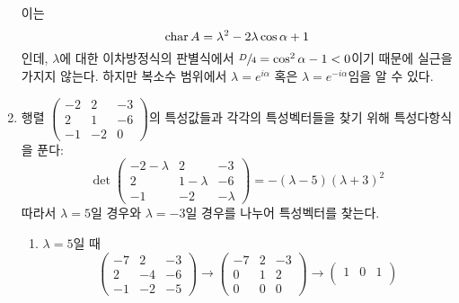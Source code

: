\documentclass[../engineering_mathematics_lecture_note.tex]{subfiles}
\begin{document}
\begin{example}
\begin{enumerate}
            이는
            \begin{equation*}
                \operatorname{char} A = \lambda^2 - 2 \lambda \cos \alpha + 1
            \end{equation*}
            인데, $\lambda$에 대한 이차방정식의 판별식에서 $\sfrac D4 = \cos^2 \alpha - 1 < 0$이기 때문에 실근을 가지지 않는다.
            하지만 복소수 범위에서 $\lambda = e^{i \alpha}$ 혹은 $\lambda = e^{-i \alpha}$임을 알 수 있다.
        \item 행렬  $\begin{pmatrix}-2 & 2 & -3\\2 & 1 & -6\\-1 & -2 & 0\end{pmatrix}$의 특성값들과 각각의 특성벡터들을 찾기 위해 특성다항식을 푼다:
            \begin{equation*}
                \det
                \begin{pmatrix}
                    -2 - \lambda & 2 & -3\\
                    2 & 1 - \lambda & -6\\
                    -1 & -2 & -\lambda
                \end{pmatrix}
                = - (\lambda - 5)(\lambda + 3)^2
            \end{equation*}
            따라서 $\lambda = 5$일 경우와 $\lambda = -3$일 경우를 나누어 특성벡터를 찾는다.
            \begin{enumerate}
                \item $\lambda = 5$일 때
                    \begin{equation*}
                        \begin{pmatrix}
                            -7 & 2 & -3\\
                            2 & -4 & -6\\
                            -1 & -2 & -5
                        \end{pmatrix}
                        \rightarrow
                        \begin{pmatrix}
                            -7 & 2 & -3\\
                            0 & 1 & 2\\
                            0 & 0 & 0
                        \end{pmatrix}
                        \rightarrow
                        \begin{pmatrix}
                            1 & 0 & 1\\

\end{pmatrix}
\end{equation*}
\end{enumerate}
\end{enumerate}
\end{example}
\end{document}
